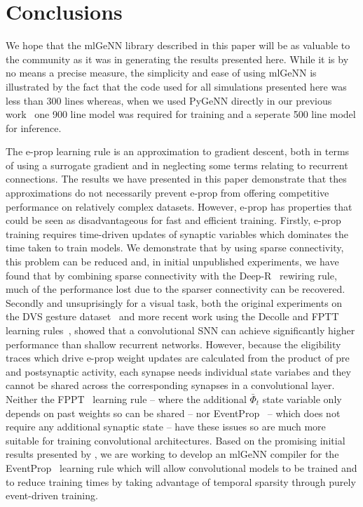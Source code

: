\documentclass[sigconf]{acmart}
\begin{document}
\section{Conclusions}
We hope that the mlGeNN library described in this paper will be as valuable to the community as it was in generating the results presented here.
While it is by no means a precise measure, the simplicity and ease of
using mlGeNN is illustrated by the fact that the code used for all
simulations presented here was less than \num{300} lines whereas, when we used PyGeNN directly in our previous work~\citep{Knight2022} one \num{900} line model was required for training and a seperate \num{500} line model for inference.

The e-prop learning rule is an approximation to gradient descent, both in terms of using a surrogate gradient and in neglecting some terms relating to recurrent connections.
The results we have presented in this paper demonstrate that thes approximations do not necessarily prevent e-prop from offering competitive performance on relatively complex datasets.
However, e-prop has properties that could be seen as disadvantageous for fast and efficient training.
Firstly, e-prop training requires time-driven updates of synaptic variables which dominates the time taken to train models.
We demonstrate that by using sparse connectivity, this problem can be reduced and, in initial unpublished experiments, we have found that by combining sparse connectivity with the Deep-R~\citep{Bellec2018a} rewiring rule, much of the performance lost due to the sparser connectivity can be recovered.
Secondly and unsuprisingly for a visual task, both the original experiments on the DVS gesture dataset~\citep{amir_low_2017} and more recent work using the Decolle and FPTT learning rules~\citep{Kaiser2020,yin2021accurate}, showed that a convolutional SNN can achieve significantly higher performance than shallow recurrent networks.
However, because the eligibility traces which drive e-prop weight updates are calculated from the product of pre and postsynaptic activity, each synapse needs individual state variabes and they cannot be shared across the corresponding synapses in a convolutional layer.
Neither the FPPT~\citep{yin2021accurate} learning rule -- where the additional $\bar{\Phi}_t$ state variable only depends on past weights so can be shared -- nor EventProp~\citep{Wunderlich2021} -- which does not require any additional synaptic state -- have these issues so are much more suitable for training convolutional architectures.
Based on the promising initial results presented by \citet{NowotnyLoss2022}, we are working to develop an mlGeNN compiler for the EventProp~\citep{Wunderlich2021} learning rule which will allow convolutional models to be trained and to reduce training times by taking advantage of temporal sparsity through purely event-driven training.
\end{document}
